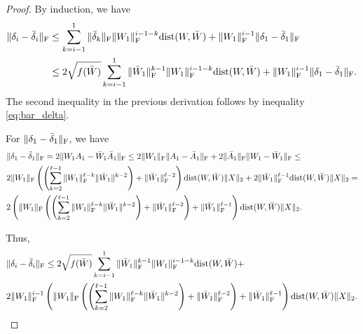 \documentclass[a4paper,11pt]{article}
\newcommand{\1}{\mathbbm{1}}
\theoremstyle{plain}
\begin{document}
\begin{proof}
By induction, we have
\begin{align*}
    \|\delta_i - \bar \delta_i\|_{\rm F} & \leq \sum_{k=i-1}^1 \|\bar \delta_k\|_{\rm F} \| W_1 \|_{\rm F}^{i-1-k} \textnormal{dist}(W,\bar W) + \|W_1\|_{\rm F}^{i-1} \| \delta_1 - \bar \delta_1\|_{\rm F} \\ & \leq 2 \sqrt{f(\bar W)} \sum_{k=i-1}^1  \|\bar W_1\|_{\rm F}^{k-1} \| W_1 \|_{\rm F}^{i-1-k} \textnormal{dist}(W,\bar W) + \|W_1\|_{\rm F}^{i-1} \| \delta_1 - \bar \delta_1\|_{\rm F}. 
\end{align*}
The second inequality in the previous derivation follows by inequality \eqref{eq:bar_delta}.

For $\|\delta_1-\bar \delta_1\|_{\rm F}$, we have
\begin{align*}
  &\|\delta_1-\bar \delta_1\|_{\rm F} = 2 \|W_1 A_1-\bar W_1 \bar A_1\|_{\rm F} \leq 2\|W_1\|_{\rm F}\|A_1-\bar A_1\|_{\rm F}+ 2 \|\bar A_1\|_{\rm F} \|W_1-\bar W_1\|_{\rm F} \leq \\ &  2\|W_1\|_{\rm F} \left(\left(\sum_{k=2}^{\ell-1} \|W_1\|_{\rm F}^{\ell-k} \|\bar W_1\|^{k-2}\right) + \|\bar W_1\|_{\rm F}^{\ell-2} \right) \textnormal{dist}(W,\bar W) \|X\|_2 + 2\|\bar W_1\|_{\rm F}^{\ell-1} \textnormal{dist}(W,\bar W) \|X\|_2 = \\ & 2\left(\|W_1\|_{\rm F} \left(\left(\sum_{k=2}^{\ell-1} \|W_1\|_{\rm F}^{\ell-k} \|\bar W_1\|^{k-2}\right) + \|\bar W_1\|_{\rm F}^{\ell-2} \right) + \|\bar W_1\|_{\rm F}^{\ell-1} \right) \textnormal{dist}(W,\bar W) \|X\|_2.
\end{align*}

Thus,
\begin{align}
\label{eq:eq8}
    &\|\delta_i - \bar \delta_i\|_{\rm F}  \nonumber \leq 2 \sqrt{f(\bar W)} \sum_{k=i-1}^1  \|\bar W_1\|_{\rm F}^{k-1} \| W_1 \|_{\rm F}^{i-1-k} \textnormal{dist}(W,\bar W) + \\& 2 \|W_1\|_{\rm F}^{i-1} \left(\|W_1\|_{\rm F} \left(\left(\sum_{k=2}^{\ell-1} \|W_1\|_{\rm F}^{\ell-k} \|\bar W_1\|^{k-2}\right) + \|\bar W_1\|_{\rm F}^{\ell-2} \right) + \|\bar W_1\|_{\rm F}^{\ell-1} \right) \textnormal{dist}(W,\bar W) \|X\|_2. 
\end{align}


\end{proof}
\end{document}
